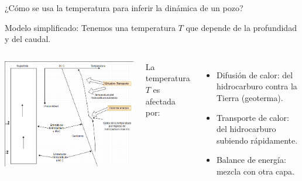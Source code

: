\documentclass[presentation]{beamer}
\begin{document}
\begin{frame}{¿Cómo se usa la temperatura para inferir la dinámica de un pozo?}
	\begin{block}{Modelo simplificado:}
		Tenemos una temperatura $T$ que depende de la profundidad y del caudal. 
	\end{block}

	\begin{columns}
	\includegraphics[width=\textwidth]{./modelo.png}
	
La temperatura $T$ es afectada por:
\begin{itemize}
	\item Difusión de calor: del hidrocarburo contra la Tierra (geoterma).
	\item Transporte de calor: del hidrocarburo subiendo rápidamente.
	\item Balance de energía: mezcla con otra capa.
\end{itemize}
\end{columns}

\end{frame}
\end{document}
